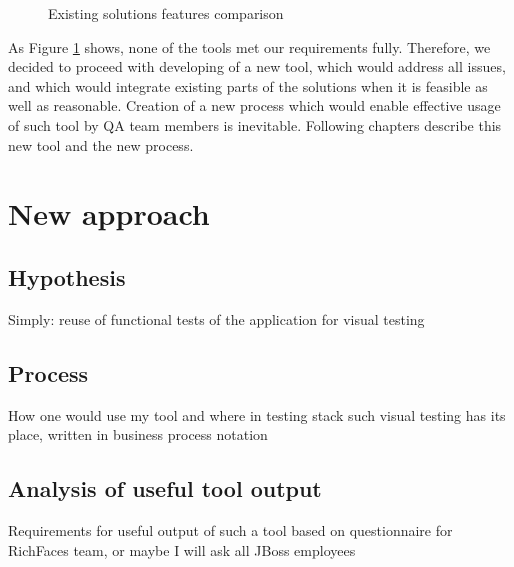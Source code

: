 \documentclass[11pt,oneside,final]{fithesis2}
\begin{document}
  \begin{figure}[!htb]
    \begin{center}
    \leavevmode
    \centerline{}
    \end{center}
    \caption{Existing solutions features comparison}
    \label{fig:existingSolutionComparison} 
  \end{figure}
  
  As Figure \ref{fig:existingSolutionComparison} shows, none of the tools met our requirements fully. Therefore, we decided to proceed with developing of a new tool, which would address
  all issues, and which would integrate existing parts of the solutions when it is feasible as well as reasonable. Creation of a new process which would enable effective usage of such
  tool by QA team members is inevitable. Following chapters describe this new tool and the new process.
  
\chapter{New approach}
  
  \section{Hypothesis}
  Simply: reuse of functional tests of the application for visual testing
  
  \section{Process}
  How one would use my tool and where in testing stack such visual testing has its place, written in business process notation
  
  \section{Analysis of useful tool output}
  Requirements for useful output of such a tool based on questionnaire for RichFaces team, or maybe I will ask all JBoss employees
  
\end{document}
